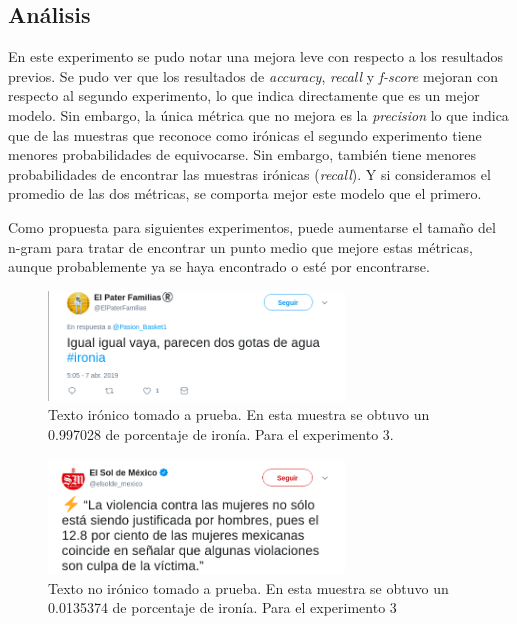 \subsection{Análisis}
\par En este experimento se pudo notar una mejora leve con respecto a los resultados previos. Se pudo ver que los resultados de \textit{accuracy}, \textit{recall} y \textit{f-score} mejoran con respecto al segundo experimento, lo que indica directamente que es un mejor modelo. Sin embargo, la única métrica que no mejora es la \textit{precision} lo que indica que de las muestras que reconoce como irónicas el segundo experimento tiene menores probabilidades de equivocarse. Sin embargo, también tiene menores probabilidades de encontrar las muestras irónicas (\textit{recall}). Y si consideramos el promedio de las dos métricas, se comporta mejor este modelo que el primero.

\par Como propuesta para siguientes experimentos, puede aumentarse el tamaño del n-gram para tratar de encontrar un punto medio que mejore estas métricas, aunque probablemente ya se haya encontrado o esté por encontrarse.

\begin{figure}
	\centering
	\includegraphics[width=0.7\textwidth]{imagenes/ironia1.png}
	\caption{Texto irónico tomado a prueba. En esta muestra se obtuvo un 0.997028 de porcentaje de ironía. Para el experimento 3.} %
	\label{fig:ironyTest1}
\end{figure}

\begin{figure}
	\centering
	\includegraphics[width=0.7\textwidth]{imagenes/ironia2.png}
	\caption{Texto no irónico tomado a prueba. En esta muestra se obtuvo un 0.0135374 de porcentaje de ironía. Para el experimento 3} %
	\label{fig:ironyTest2}
\end{figure}

